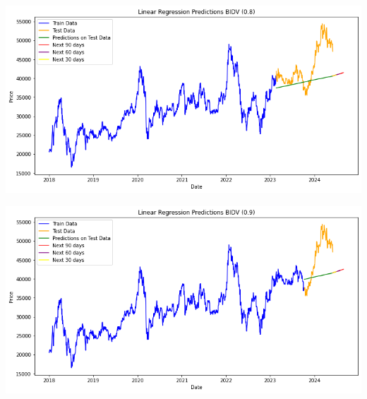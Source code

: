 \documentclass[conference]{IEEEtran}
\begin{document}
\begin{minipage}{0.23\textwidth}
    \centering
    \includegraphics[width=\linewidth]{images/LR/LR_BIDV_82.png}
    \label{fig:image1}
\end{minipage}
\hfill
\begin{minipage}{0.23\textwidth}
    \centering
    \includegraphics[width=\linewidth]{images/LR/LR_BIDV_91.png}
    \label{fig:image2}
\end{minipage}
\end{document}
